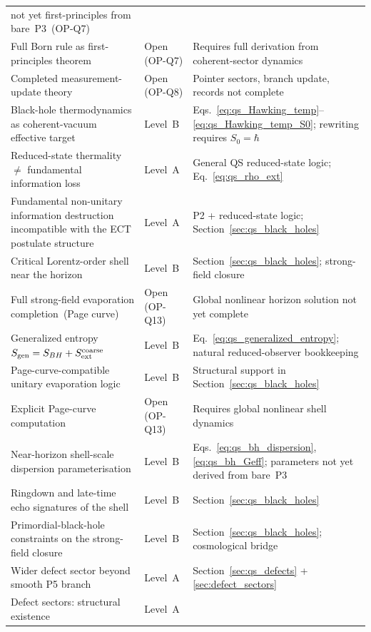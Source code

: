\begin{table}[h]
\begin{tabular}{p{6.0cm}p{2.4cm}p{4.5cm}}
    not yet first-principles from bare~P3~(OP-Q7) \\
Full Born rule as first-principles theorem
  & Open (OP-Q7)
  & Requires full derivation from coherent-sector dynamics \\
Completed measurement-update theory
  & Open (OP-Q8)
  & Pointer sectors, branch update, records not complete \\
Black-hole thermodynamics as coherent-vacuum effective target
  & Level~B
  & Eqs.~\eqref{eq:qs_Hawking_temp}--\eqref{eq:qs_Hawking_temp_S0};
    rewriting requires $S_0=\hbar$ \\
Reduced-state thermality $\neq$ fundamental information loss
  & Level~A
  & General QS reduced-state logic;
    Eq.~\eqref{eq:qs_rho_ext} \\
Fundamental non-unitary information destruction incompatible
  with the ECT postulate structure
  & Level~A
  & P2 + reduced-state logic; Section~\ref{sec:qs_black_holes} \\
Critical Lorentz-order shell near the horizon
  & Level~B
  & Section~\ref{sec:qs_black_holes}; strong-field closure \\
Full strong-field evaporation completion~(Page curve)
  & Open (OP-Q13)
  & Global nonlinear horizon solution not yet complete \\
Generalized entropy $S_{\rm gen}=S_{BH}+S_{\rm ext}^{\rm coarse}$
  & Level~B
  & Eq.~\eqref{eq:qs_generalized_entropy};
    natural reduced-observer bookkeeping \\
Page-curve-compatible unitary evaporation logic
  & Level~B
  & Structural support in Section~\ref{sec:qs_black_holes} \\
Explicit Page-curve computation
  & Open (OP-Q13)
  & Requires global nonlinear shell dynamics \\
Near-horizon shell-scale dispersion parameterisation
  & Level~B
  & Eqs.~\eqref{eq:qs_bh_dispersion},
    \eqref{eq:qs_bh_Geff};
    parameters not yet derived from bare~P3 \\
Ringdown and late-time echo signatures of the shell
  & Level~B
  & Section~\ref{sec:qs_black_holes} \\
Primordial-black-hole constraints on the strong-field closure
  & Level~B
  & Section~\ref{sec:qs_black_holes}; cosmological bridge \\
Wider defect sector beyond smooth P5 branch
  & Level~A
  & Section~\ref{sec:qs_defects} + \ref{sec:defect_sectors} \\
Defect sectors: structural existence
  & Level~A

\end{tabular}
\end{table}
